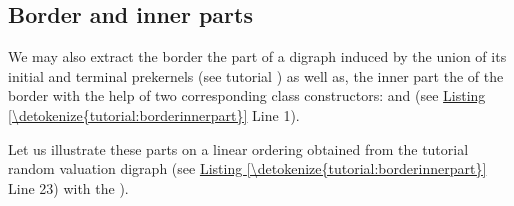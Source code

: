 \documentclass[a4paper,12pt,english]{sphinxhowto}
\begin{document}
\subsection{Border and inner parts}
\label{\detokenize{tutorial:border-and-inner-parts}}
We may also extract the border \sphinxhyphen{}the part of a digraph induced by the union of its initial and terminal prekernels (see tutorial {\hyperref[\detokenize{tutorial:kernel-tutorial-label}]{}})\sphinxhyphen{}  as well as, the inner part \sphinxhyphen{}the  of the border\sphinxhyphen{} with the help of two corresponding class constructors:  and  (see \hyperref[\detokenize{tutorial:borderinnerpart}]{Listing \ref{\detokenize{tutorial:borderinnerpart}}}  Line 1).

Let us illustrate these parts on a linear ordering obtained from the tutorial random valuation digraph  (see \hyperref[\detokenize{tutorial:borderinnerpart}]{Listing \ref{\detokenize{tutorial:borderinnerpart}}} Line 2\sphinxhyphen{}3) with the {\hyperref[\detokenize{tutorial:ranking-tutorial-label}]{}}).
\def\sphinxLiteralBlockLabel{\label{\detokenize{tutorial:borderinnerpart}}}
\begin{sphinxVerbatim}[commandchars=\\\{\},numbers=left,firstnumber=1,stepnumber=1]
    
   
  
  
\PYG{p}{[}\PYG{p}{]}\PYG{p}{[}\PYG{p}{]}
  
\PYG{p}{[}\PYG{p}{]}\PYG{p}{[}\PYG{p}{]}
\end{sphinxVerbatim}
\end{document}
